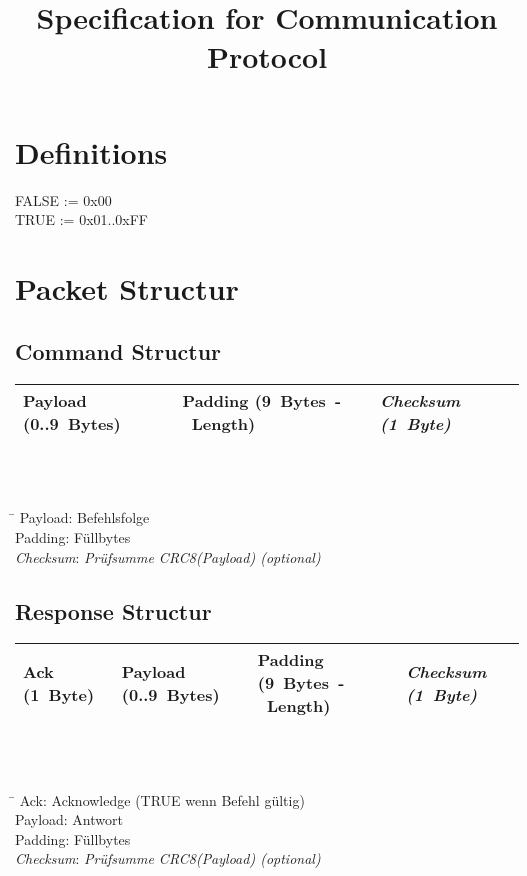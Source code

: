 \documentclass[10pt,a4paper]{article}
\title{Specification for Communication Protocol}
\author{}
\date{}
\newcommand{\BL}{9 }
\begin{document}
\maketitle
\tableofcontents
\section*{Definitions}
FALSE := 0x00\\
TRUE := 0x01..0xFF\\

\section{Packet Structur}
\subsection{Command Structur}
\begin{tabular}{|p{2.2cm}|p{3.2cm}|p{2cm}|}
	\hline 
	Payload \mbox{(0..\BL Bytes)} & 
	Padding \mbox{(\BL Bytes - Length)} & 
	\textit{Checksum \mbox{(1 Byte)}} \\
	\hline 
\end{tabular}  
\\\\
\begin{tabbing}
	\hspace*{2cm} \= \kill
	Payload: \>Befehlsfolge\\
	Padding: \>Füllbytes\\
	\textit{Checksum}: \>\textit{Prüfsumme CRC8(Payload) (optional)}\\
\end{tabbing}

\subsection{Response Structur} 
\begin{tabular}{|p{1.5cm}|p{2.2cm}|p{3.2cm}|p{2cm}|}
	\hline 
	Ack \mbox{(1 Byte)} &
	Payload \mbox{(0..\BL Bytes)} & 
	Padding \mbox{(\BL Bytes - Length)} & 
	\textit{Checksum \mbox{(1 Byte)}} \\
	\hline 
\end{tabular}  
\\\\
\begin{tabbing}
	\hspace*{2cm} \= \kill
	Ack:	 \>Acknowledge (TRUE wenn Befehl gültig)\\
	Payload: \>Antwort\\
	Padding: \>Füllbytes\\
	\textit{Checksum}: \>\textit{Prüfsumme CRC8(Payload) (optional)}\\
\end{tabbing}
\end{document}
